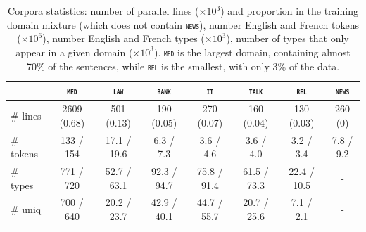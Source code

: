 \documentclass[11pt,a4paper]{article}
\newcommand{\revision}[1]{#1}
\newcommand{\domain}[1]{\texttt{\textsc{#1}}}
\begin{document}

\begin{table}[htbp]
  \centering
  \begin{tabular}{|l|ccccccc|} %
    \cline{2-8} 
    \multicolumn{1}{c|}{} & \multicolumn{1}{c}{\domain{med}} & \multicolumn{1}{c}{\domain{law}} & \multicolumn{1}{c}{\domain{bank}} & \multicolumn{1}{c}{\domain{it}} & \multicolumn{1}{c}{\domain{talk}} & \multicolumn{1}{c}{\domain{rel}} & \multicolumn{1}{c|}{\domain{news}} \\
    \hline 
    \# lines & 2609 (0.68) & 501 (0.13) & 190 (0.05) & 270 (0.07) & 160 (0.04) & 130 (0.03) & 260 (0) \\
    \# \revision{tokens}  &  133 / 154  &  17.1 / 19.6 &  6.3 / 7.3 &  3.6 / 4.6 &  3.6 / 4.0 &  3.2 / 3.4 & 7.8 / 9.2   \\
    \# \revision{types}  & 771 / 720 & 52.7 / 63.1 & 92.3 / 94.7 & 75.8 / 91.4 & 61.5 / 73.3 & 22.4 / 10.5 & - \\
    \# \revision{uniq} & 700 / 640 & 20.2 / 23.7 & 42.9 / 40.1 & 44.7 / 55.7 & 20.7 / 25.6 & 7.1 / 2.1 & - \\
    \hline
  \end{tabular}
  \caption{Corpora statistics: number of parallel lines ($\times 10^3$) and proportion in the training domain mixture (which does not contain \domain{news}), number English and French tokens ($\times 10^6$), number English and French types ($\times 10^3$), number of types that only appear in a given domain ($\times 10^3$). \domain{med} is the largest domain, containing almost 70\% of the sentences, while \domain{rel} is the smallest, with only 3\% of the data.
  }
\label{tab:Corpora}
\end{table}
\end{document}
